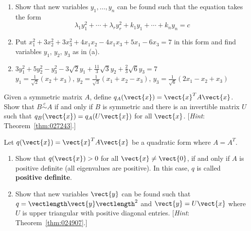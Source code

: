\begin{multicols}{2}
\begin{ex}
\begin{enumerate}[label={\alph*.}]
\item Show that new variables $y_{1}, \dots, y_{n}$ can be found such that the equation takes the form 
\begin{equation*}
\lambda_{1}y_{1}^2 + \cdots + \lambda_{r}y_{r}^2 + k_{1}y_{1} + \cdots + k_{n}y_{n} = c
\end{equation*}

\item Put $x_{1}^2 + 3x_{2}^2 + 3x_{3}^2 + 4x_{1}x_{2} - 4x_{1}x_{3} + 5x_{1} - 6x_{3} = 7$ in this form and find variables $y_{1}$, $y_{2}$, $y_{3}$ as in (a).

\end{enumerate}
\begin{sol}
\begin{enumerate}[label={\alph*.}]
\setcounter{enumi}{1}
\item $3y_{1}^2 + 5y_{2}^2 - y_{3}^2 - 3\sqrt{2}y_{1} + \frac{11}{3}\sqrt{3}y_{2} + \frac{2}{3}\sqrt{6}y_{3} = 7$ \\
$y_{1} = \frac{1}{\sqrt{2}}(x_{2} + x_{3})$, $y_{2} = \frac{1}{\sqrt{3}}(x_{1} + x_{2} - x_{3})$, $y_{3} = \frac{1}{\sqrt{6}}(2x_{1} - x_{2} + x_{3})$


\end{enumerate}
\end{sol}
\end{ex}


\begin{ex}
Given a symmetric matrix $A$, define $q_{A}(\vect{x}) = \vect{x}^{T}A\vect{x}$. Show that $B \stackrel{c}{\sim} A$ if and only if $B$ is symmetric and there is an invertible matrix $U$ such that $q_{B}(\vect{x}) = q_{A}(U\vect{x})$ for all $\vect{x}$. [\textit{Hint}: Theorem~\ref{thm:027243}.]
\end{ex}

\begin{ex}
Let $q(\vect{x}) = \vect{x}^{T}A\vect{x}$ be a quadratic form where $A = A^{T}$.


\begin{enumerate}[label={\alph*.}]
\item Show that $q(\vect{x}) > 0$ for all $\vect{x} \neq \vect{0}$, if and only if $A$ is positive definite (all eigenvalues are positive). In this case, $q$ is called \textbf{positive definite}.

\item Show that new variables $\vect{y}$ can be found such that $q = \vectlength\vect{y}\vectlength^{2}$ and $\vect{y} = U\vect{x}$ where $U$ is upper triangular with positive diagonal entries. [\textit{Hint}: Theorem~\ref{thm:024907}.]


\end{enumerate}
\end{ex}
\end{multicols}
